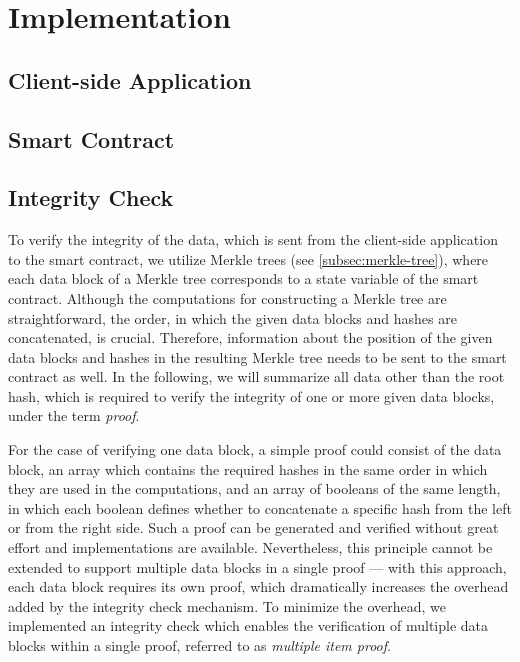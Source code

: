 \section{Implementation}
\label{sec:approach-implementation}

	\subsection{Client-side Application}
	\label{subsec:approach-implementation-client}

	\subsection{Smart Contract}
	\label{subsec:approach-implementation-sc}

	\subsection{Integrity Check}
	\label{sec:mip}

		To verify the integrity of the data, which is sent from the client-side application to the smart contract, we utilize Merkle trees (see \autoref{subsec:merkle-tree}), where each data block of a Merkle tree corresponds to a state variable of the smart contract.
		Although the computations for constructing a Merkle tree are straightforward, the order, in which the given data blocks and hashes are concatenated, is crucial.
		Therefore, information about the position of the given data blocks and hashes in the resulting Merkle tree needs to be sent to the smart contract as well.
		In the following, we will summarize all data other than the root hash, which is required to verify the integrity of one or more given data blocks, under the term \emph{proof}.
		
		For the case of verifying one data block, a simple proof could consist of the data block, an array which contains the required hashes in the same order in which they are used in the computations, and an array of booleans of the same length, in which each boolean defines whether to concatenate a specific hash from the left or from the right side.
		Such a proof can be generated and verified without great effort and implementations are available.
		Nevertheless, this principle cannot be extended to support multiple data blocks in a single proof --- with this approach, each data block requires its own proof, which dramatically increases the overhead added by the integrity check mechanism.
		To minimize the overhead, we implemented an integrity check which enables the verification of multiple data blocks within a single proof, referred to as \emph{multiple item proof}.

